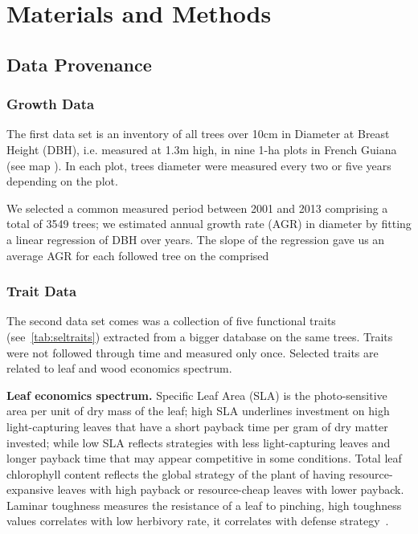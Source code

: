 \section*{Materials and Methods}
\label{sec:M&M}

\subsection*{Data Provenance}

\subsubsection*{Growth Data}
The first data set is an inventory of all trees over 10cm in Diameter at Breast Height (DBH), i.e. measured at 1.3m high, in nine 1-ha plots in French Guiana (see map \missfig). In each plot, trees diameter were measured every two or five years depending on the plot.

We selected a common measured period between 2001 and 2013 comprising a total of 3549 trees; we estimated annual growth rate (AGR) in diameter by fitting a linear regression of DBH over years. The slope of the regression gave us an average AGR for each followed tree on the comprised 


\subsubsection*{Trait Data}

The second data set comes was a collection of five functional traits (see~\autoref{tab:seltraits}) extracted from a bigger database \citep{baraloto_decoupled_2010} on the same trees. Traits were not followed through time and measured only once. Selected traits are related to leaf and wood economics spectrum\citep{westoby_leaf-height-seed_1998, baraloto_decoupled_2010}.

\textbf{Leaf economics spectrum.} Specific Leaf Area (SLA) is the photo-sensitive area per unit of dry mass of the leaf; high SLA underlines investment on high light-capturing leaves that have a short payback time per gram of dry matter invested; while low SLA reflects strategies with less light-capturing leaves and longer payback time that may appear competitive in some conditions. Total leaf chlorophyll content reflects the global strategy of the plant of having resource-expansive leaves with high payback or resource-cheap leaves with lower payback. Laminar toughness measures the resistance of a leaf to pinching, high toughness values correlates with low herbivory rate, it correlates with defense strategy~\citep{westoby_leaf-height-seed_1998}.

